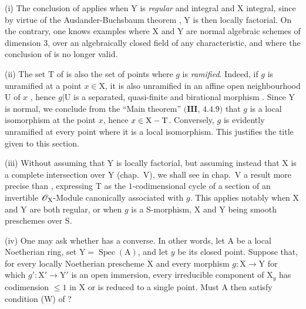 \begin{remarks}[21.12.14]
\label{IV.21.12.14}
(i)
The conclusion of  applies when $\mathrm{Y}$ is \emph{regular} and integral and $\mathrm{X}$ integral, since by virtue of the Auslander-Buchsbaum theorem , $\mathrm{Y}$ is then locally factorial.
On the contrary, one knows examples where $\mathrm{X}$ and $\mathrm{Y}$ are normal algebraic schemes of dimension $3$, over an algebraically closed field of any characteristic, and where the conclusion of  is no longer valid.

(ii)
The set $\mathrm{T}$ of  is also the set of points where $g$ is \emph{ramified}.
Indeed, if $g$ is unramified at a point $x\in\mathrm{X}$, it is also unramified in an affine open neighbourhood $\mathrm{U}$ of $x$ , hence $g|\mathrm{U}$ is a separated, quasi-finite and birational morphism .
Since $\mathrm{Y}$ is normal, we conclude from the ``Main theorem'' $(\mathbf{III}$, $4.4.9)$ that $g$ is a local isomorphism at the point $x$, hence $x\in\mathrm{X}-\mathrm{T}$.
Conversely, $g$ is evidently unramified at every point where it is a local isomorphism.
This justifies the title given to this section.

(iii)
Without assuming that $\mathrm{Y}$ is locally factorial, but assuming instead that $\mathrm{X}$ is a complete intersection over $\mathrm{Y}$ (chap.~V), we shall see in chap.~V a result more precise than , expressing $\mathrm{T}$ as the $1$-codimensional cycle of a section of an invertible $\mathscr{O}_{\mathrm{X}}$-Module canonically associated with $g$.
This applies notably when $\mathrm{X}$ and $\mathrm{Y}$ are both regular, or when $g$ is a S-morphism, $\mathrm{X}$ and $\mathrm{Y}$ being smooth preschemes over $\mathrm{S}$.

(iv) One may ask whether  has a converse.  In other words, let $\mathrm{A}$ be a local Noetherian ring, set $\mathrm{Y}=\operatorname{Spec}(\mathrm{A})$, and let $y$ be its closed point.  Suppose that, for every locally Noetherian prescheme $\mathrm{X}$ and every morphism $g:\mathrm{X}\to\mathrm{Y}$ for which $g':\mathrm{X}'\to\mathrm{Y}'$ is an open immersion, every irreducible component of $\mathrm{X}_y$ has codimension $\leq 1$ in $\mathrm{X}$ or is reduced to a single point.  Must $\mathrm{A}$ then satisfy condition (W) of ?


\end{remarks}
